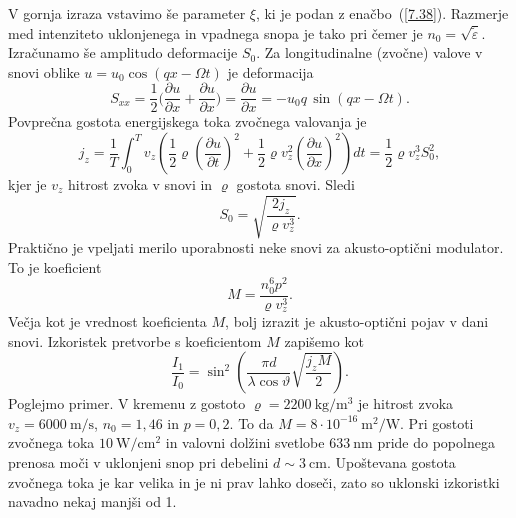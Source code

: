 V gornja izraza vstavimo še parameter $\xi$, ki je podan z enačbo~(\ref{7.38}).
Razmerje med intenziteto uklonjenega in vpadnega snopa je tako
pri čemer je $n_0=\sqrt{\tilde{\varepsilon}}$.
Izračunamo še amplitudo deformacije $S_0$. Za longitudinalne (zvočne) valove v snovi oblike 
$u = u_0 \cos(qx - \Omega t)$ je deformacija 
\begin{equation}
S_{xx} = \frac{1}{2}\bigl( \frac{\partial u}{\partial x}+ 
\frac{\partial u}{\partial x}\bigr) = \frac{\partial u}{\partial x} = - u_0 q\, \sin(qx - \Omega t).
\end{equation}
Povprečna gostota energijskega toka zvočnega valovanja je 
\begin{equation}
j_{z}= \frac{1}{T}\int_0^T 
v_z \left(\frac{1}{2} \varrho \left(\frac{\partial u}{\partial t}\right)^2
+ \frac{1}{2} \varrho v_z^2\left(\frac{\partial u}{\partial x}\right)^2
\right) dt = \frac{1}{2} \varrho v_z^3 S_0^2,
\label{7.49}
\end{equation}
kjer je $v_z$ hitrost zvoka v snovi in $\varrho$ gostota snovi. 
Sledi 
\begin{equation}
S_{0}=\sqrt{\frac{2j_{z}}{\varrho v_{z}^{3}}}.
\label{7.50}
\end{equation}
Praktično je vpeljati merilo uporabnosti neke snovi za akusto-optični modulator. To je 
koeficient 
\begin{equation}
M=\frac{n_{0}^{6}p^{2}}{\varrho v_{z}^{3}}.
\label{7.51}
\end{equation}
Večja kot je vrednost koeficienta $M$, bolj izrazit je akusto-optični pojav v dani snovi. 
Izkoristek pretvorbe s koeficientom $M$ zapišemo kot
\begin{equation}
 \frac{I_{1}}{I_{0}}=\sin^{2}\left(\frac{\pi d}{\lambda\cos\vartheta}\sqrt{\frac{j_z M}{2}}\right).
\end{equation}
Poglejmo primer. V kremenu z gostoto $\varrho=2200~\si{\kilo\gram/\metre^3}$ 
je hitrost zvoka $v_{z}=6000~\si{\metre/\second}$,
$n_0=1,46$ in $p=0,2$. To da $M=8\cdot10^{-16}~\si{\metre^2/\watt}$.
Pri gostoti zvočnega toka $10~\si{\watt/\centi\metre^2}$ in valovni dolžini svetlobe 
$633~\si{\nano\metre}$ pride do popolnega prenosa moči v uklonjeni snop pri 
debelini $d \sim 3~\si{\centi\metre}$. Upoštevana gostota zvočnega toka je kar velika
in je ni prav lahko doseči, zato so uklonski izkoristki navadno nekaj manjši od 1.

